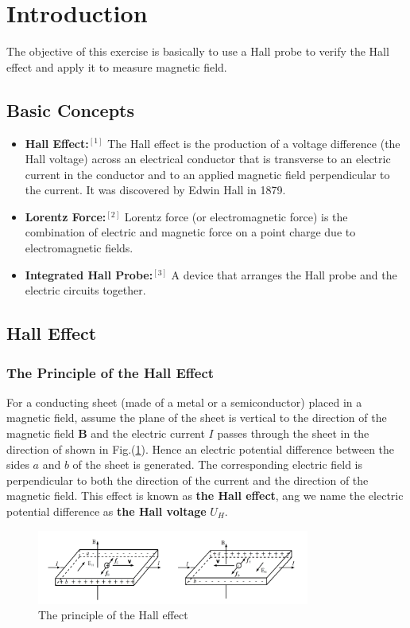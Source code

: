\documentclass[a4paper]{article}
\begin{document}


\newpage
\tableofcontents
\setcounter{page}{1}

\newpage
\listoffigures
\listoftables

\newpage
\section{Introduction}
The objective of this exercise is basically to use a Hall probe to verify the Hall effect and apply it to measure magnetic field.

\subsection{Basic Concepts}
\begin{itemize}
	\item \textbf{Hall Effect:}$^{[1]}$ The Hall effect is the production of a voltage difference (the Hall voltage) across an electrical conductor that is transverse to an
	      electric current in the conductor and to an applied magnetic field perpendicular to the current. It was discovered by Edwin Hall in 1879.
	\item \textbf{Lorentz Force:}$^{[2]}$ Lorentz force (or electromagnetic force) is the combination of electric and magnetic force on a point charge due to electromagnetic
	      fields.
	\item \textbf{Integrated Hall Probe:}$^{[3]}$ A device that arranges the Hall probe and the electric circuits together.
\end{itemize}

\subsection{Hall Effect}
\subsubsection{The Principle of the Hall Effect}
\par For a conducting sheet (made of a metal or a semiconductor) placed in a magnetic field, assume the plane of the sheet is vertical to the direction of the magnetic field
\textbf{B} and the electric current $I$ passes through the sheet in the direction of shown in  Fig.(\ref{fig::the principle}). Hence an electric potential difference
between  the sides $a$ and $b$ of the sheet is generated. The corresponding electric field is perpendicular to both the direction of the current and the direction of the
magnetic field. This effect is known as \textbf{the Hall effect}, ang we name the electric potential difference as \textbf{the Hall voltage} $U_H$.
\begin{figure}[!htbp]
	\centering
	\includegraphics[width=0.8\textwidth]{the principle.png}
	\caption{The principle of the Hall effect}
	\label{fig::the principle}
\end{figure}
\end{document}
